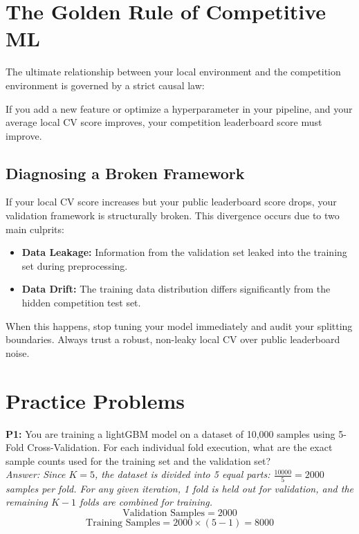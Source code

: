 \documentclass{article}
\begin{document}
\section{The Golden Rule of Competitive ML}
The ultimate relationship between your local environment and the competition environment is governed by a strict causal law:

\begin{tcolorbox}[colback=yellow!10!white,colframe=yellow!70!black,title=The Golden Rule]
If you add a new feature or optimize a hyperparameter in your pipeline, and your average local CV score improves, your competition leaderboard score must improve.
\end{tcolorbox}

\subsection{Diagnosing a Broken Framework}
If your local CV score increases but your public leaderboard score drops, your validation framework is structurally broken. This divergence occurs due to two main culprits:
\begin{itemize}
    \item \textbf{Data Leakage:} Information from the validation set leaked into the training set during preprocessing.
    \item \textbf{Data Drift:} The training data distribution differs significantly from the hidden competition test set.
\end{itemize}
When this happens, stop tuning your model immediately and audit your splitting boundaries. Always trust a robust, non-leaky local CV over public leaderboard noise.

\newpage
\section{Practice Problems}

\textbf{P1:} You are training a lightGBM model on a dataset of 10,000 samples using 5-Fold Cross-Validation. For each individual fold execution, what are the exact sample counts used for the training set and the validation set?
\\
\textit{Answer: Since $K=5$, the dataset is divided into 5 equal parts: $\frac{10000}{5} = 2000$ samples per fold. For any given iteration, 1 fold is held out for validation, and the remaining $K-1$ folds are combined for training.
$$\text{Validation Samples} = 2000$$
$$\text{Training Samples} = 2000 \times (5 - 1) = 8000$$}
\end{document}
